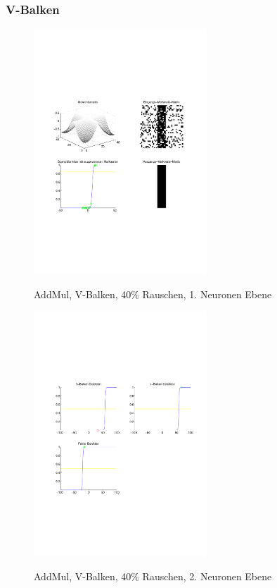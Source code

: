 \subsubsection{V-Balken}
\begin{figure}[hbt]
	\begin{minipage}[c]{\textwidth}
		\centering
       	\includegraphics[trim=71 213 43 212, clip, width=0.58\textwidth]{./Bilder/Auswertung/Endergebnis/TypeAddMul_Rauschen40_V_Line_Layer1}
		\caption{AddMul, V-Balken, 40\% Rauschen, 1. Neuronen Ebene}
		\label{AddMul_V_40_1}
		\vfill
		\includegraphics[trim=71 213 43 212, clip, width=0.58\textwidth]{./Bilder/Auswertung/Endergebnis/TypeAddMul_Rauschen40_V_Line_Layer2}
		\caption{AddMul, V-Balken, 40\% Rauschen, 2. Neuronen Ebene}
		\label{AddMul_V_40_2}
	\end{minipage}
\end{figure}


